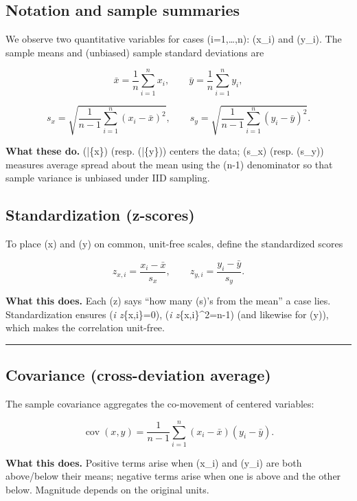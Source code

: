 \documentclass[
  letterpaper,
  DIV=11,
  numbers=noendperiod]{scrreprt}
\begin{document}
\subsection{Notation and sample
summaries}\label{notation-and-sample-summaries}

We observe two quantitative variables for cases (i=1,\ldots,n): (x\_i)
and (y\_i). The sample means and (unbiased) sample standard deviations
are

\[
\bar{x}=\frac{1}{n}\sum_{i=1}^n x_i,
\qquad
\bar{y}=\frac{1}{n}\sum_{i=1}^n y_i,
\]

\[
s_x=\sqrt{\frac{1}{n-1}\sum_{i=1}^n (x_i-\bar{x})^2},
\qquad
s_y=\sqrt{\frac{1}{n-1}\sum_{i=1}^n (y_i-\bar{y})^2}.
\]

\textbf{What these do.} (\bar\{x\}) (resp. (\bar\{y\})) centers the
data; (s\_x) (resp. (s\_y)) measures average spread about the mean using
the (n-1) denominator so that sample variance is unbiased under IID
sampling.

\subsection{Standardization
(z-scores)}\label{standardization-z-scores-1}

To place (x) and (y) on common, unit-free scales, define the
standardized scores

\[
z_{x,i}=\frac{x_i-\bar{x}}{s_x},
\qquad
z_{y,i}=\frac{y_i-\bar{y}}{s_y}.
\]

\textbf{What this does.} Each (z) says ``how many (s)'s from the mean''
a case lies. Standardization ensures (\sum\emph{i z}\{x,i\}=0),
(\sum\emph{i z}\{x,i\}\^{}2=n-1) (and likewise for (y)), which makes the
correlation unit-free.

\begin{center}\rule{0.5\linewidth}{0.5pt}\end{center}

\subsection{Covariance (cross-deviation
average)}\label{covariance-cross-deviation-average}

The sample covariance aggregates the co-movement of centered variables:

\[
\operatorname{cov}(x,y)
=\frac{1}{n-1}\sum_{i=1}^n (x_i-\bar{x})(y_i-\bar{y}).
\]

\textbf{What this does.} Positive terms arise when (x\_i) and (y\_i) are
both above/below their means; negative terms arise when one is above and
the other below. Magnitude depends on the original units.
\end{document}
